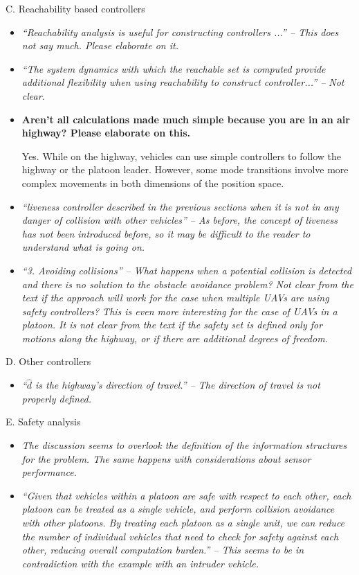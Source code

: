 \documentclass[submit]{aiaa-pretty}
\begin{document}
C. Reachability based controllers
\begin{itemize}
\item \textit{``Reachability analysis is useful for constructing controllers ...'' – This does not say much. Please elaborate on it.}
\item \textit{``The system dynamics with which the reachable set is computed provide additional flexibility when using reachability to construct controller...'' – Not clear.}
\item \textbf{Aren’t all calculations made much simple because you are in an air highway? Please elaborate on this.}

Yes. While on the highway, vehicles can use simple controllers to follow the highway or the platoon leader. However, some mode transitions involve more complex movements in both dimensions of the position space.

\item \textit{``liveness controller described in the previous sections when it is not in any danger of collision with other vehicles'' – As before, the concept of liveness has not been introduced before, so it may be difficult to the reader to understand what is going on.}
\item \textit{``3. Avoiding collisions'' – What happens when a potential collision is detected and there is no solution to the obstacle avoidance problem? Not clear from the text if the approach will work for the case when multiple UAVs are using safety controllers? This is even more interesting for the case of UAVs in a platoon. It is not clear from the text if the safety set is defined only for motions along the highway, or if there are additional degrees of freedom.}
\end{itemize}

D. Other controllers
\begin{itemize}
\item \textit{``$\hat d$ is the highway’s direction of travel.'' – The direction of travel is not properly defined.}
\end{itemize}

E. Safety analysis
\begin{itemize}
\item \textit{The discussion seems to overlook the definition of the information structures for the problem. The same happens with considerations about sensor performance.}
\item \textit{``Given that vehicles within a platoon are safe with respect to each other, each platoon can be treated as a single vehicle, and perform collision avoidance with other platoons. By treating each platoon as a single unit, we can reduce the number of individual vehicles that need to check for safety against each other, reducing overall computation burden.'' – This seems to be in contradiction with the example with an intruder vehicle.}
\end{itemize}
\end{document}

